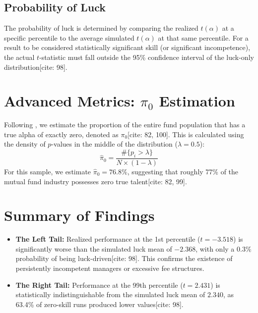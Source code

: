 \documentclass[12pt,a4paper]{article}
\begin{document}
\subsection{Probability of Luck}
The probability of luck is determined by comparing the realized $t(\alpha)$ at a specific percentile to the average simulated $t(\alpha)$ at that same percentile. For a result to be considered statistically significant skill (or significant incompetence), the actual $t$-statistic must fall outside the 95\% confidence interval of the luck-only distribution[cite: 98].

\section{Advanced Metrics: $\pi_0$ Estimation}
Following \textcite{FamaFrench2010}, we estimate the proportion of the entire fund population that has a true alpha of exactly zero, denoted as $\pi_0$[cite: 82, 100]. This is calculated using the density of $p$-values in the middle of the distribution ($\lambda = 0.5$):
\begin{equation}
    \hat{\pi}_0 = \frac{\#\{p_i > \lambda\}}{N \times (1 - \lambda)}
\end{equation}
For this sample, we estimate $\hat{\pi}_0 = 76.8\%$, suggesting that roughly 77\% of the mutual fund industry possesses zero true talent[cite: 82, 99].

\section{Summary of Findings}
\begin{itemize}
    \item \textbf{The Left Tail:} Realized performance at the 1st percentile ($t = -3.518$) is significantly worse than the simulated luck mean of $-2.368$, with only a 0.3\% probability of being luck-driven[cite: 98]. This confirms the existence of persistently incompetent managers or excessive fee structures.
    \item \textbf{The Right Tail:} Performance at the 99th percentile ($t = 2.431$) is statistically indistinguishable from the simulated luck mean of $2.340$, as 63.4\% of zero-skill runs produced lower values[cite: 98].
\end{itemize}
\end{document}
